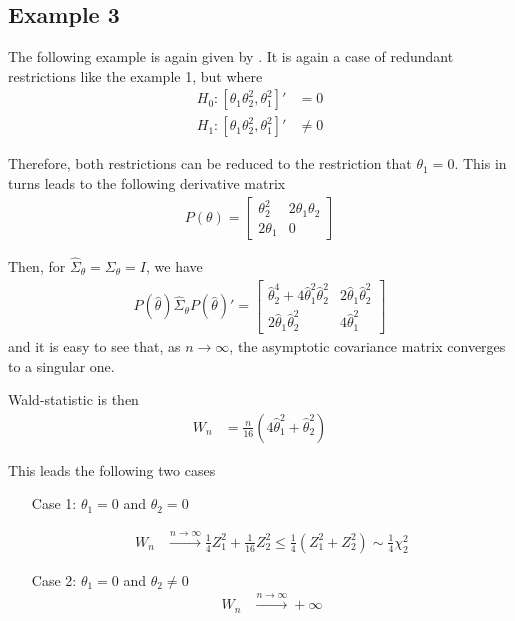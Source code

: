 \documentclass[11pt]{article}\usepackage[]{graphicx}\usepackage[]{color}
\begin{document}
\subsection{Example 3}

The following example is again given by \cite{dufour_wald_2013}. It is again a case of redundant restrictions like the example 1, but where
\begin{align}
	H_0: [\theta_1 \theta_2^2 , \theta_1^2]' & = 0 \\
	H_1: [\theta_1 \theta_2^2 , \theta_1^2]'  & \neq 0
\end{align}

Therefore, both restrictions can be reduced to the restriction that $\theta_1=0$. This in turns leads to the following derivative matrix
\begin{align}
	P(\theta) = \left[\begin{array}{cc}
		\theta_2^2 & 2\theta_1 \theta_2 \\
		2\theta_1 & 0
	\end{array}\right]
\end{align}

Then, for $\hat{\Sigma}_\theta=\Sigma_\theta=I$, we have
\begin{align}
	P(\hat{\theta})\hat{\Sigma}_\theta P(\hat{\theta})' = \left[\begin{array}{cc}
		\hat{\theta}_2^4 + 4 \hat{\theta}_1^2\hat{\theta}_2^2 &  2 \hat{\theta}_1\hat{\theta}_2^2 \\
		2 \hat{\theta}_1\hat{\theta}_2^2&  4 \hat{\theta}_1^2
	\end{array}\right]
\end{align}
and it is easy to see that, as $n\rightarrow\infty$, the asymptotic covariance matrix converges to a singular one.

Wald-statistic is then
\begin{align}
	W_n & = \frac{n}{16}(4 \hat{\theta}_1^2 + \hat{\theta}_2^2)
\end{align}

This leads the following two cases \begin{itemize}
	\item[Case 1:] $\theta_1=0$ and $ \theta_2 = 0$

	\begin{align}
		W_n & \xrightarrow{n \rightarrow \infty} \frac{1}{4} Z_1^2 + \frac{1}{16} Z_2^2 \leq \frac{1}{4}( Z_1^2 + Z_2^2) \sim \frac{1}{4} \chi^2_2
	\end{align}

	\item[Case 2:] $\theta_1=0$ and $ \theta_2 \neq 0$
	\begin{align}
		W_n & \xrightarrow{n \rightarrow \infty} + \infty
	\end{align}
\end{itemize}
\end{document}
